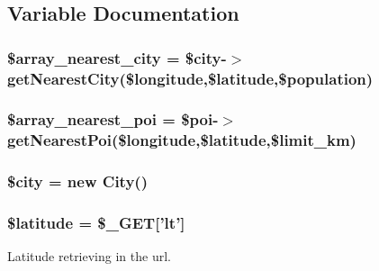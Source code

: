 \subsection{Variable Documentation}
\hypertarget{nearest_8php_ad20bfb1568497d36431fbd90847417cc}{
\subsubsection[{\$array\-\_\-nearest\-\_\-city}]{\setlength{\rightskip}{0pt plus 5cm}\$array\-\_\-nearest\-\_\-city = \$city-\/$>$get\-Nearest\-City(\$longitude,\$latitude,\$population)}}\label{nearest_8php_ad20bfb1568497d36431fbd90847417cc}
\hypertarget{nearest_8php_a0919b64d32b8806e2d59272d197f32e7}{
\subsubsection[{\$array\-\_\-nearest\-\_\-poi}]{\setlength{\rightskip}{0pt plus 5cm}\$array\-\_\-nearest\-\_\-poi = \$poi-\/$>$get\-Nearest\-Poi(\$longitude,\$latitude,\$limit\-\_\-km)}}\label{nearest_8php_a0919b64d32b8806e2d59272d197f32e7}
\hypertarget{nearest_8php_a5b9ddd3e3a69d8901270064346bdef49}{
\subsubsection[{\$city}]{\setlength{\rightskip}{0pt plus 5cm}\$city = new {\bf City}()}}\label{nearest_8php_a5b9ddd3e3a69d8901270064346bdef49}
\hypertarget{nearest_8php_a5635a7326fb0b96e184ca6f5baa13e94}{
\subsubsection[{\$latitude}]{\setlength{\rightskip}{0pt plus 5cm}\$latitude = \$\-\_\-\-G\-E\-T\mbox{[}'lt'\mbox{]}}}\label{nearest_8php_a5635a7326fb0b96e184ca6f5baa13e94}


Latitude retrieving in the url. 

